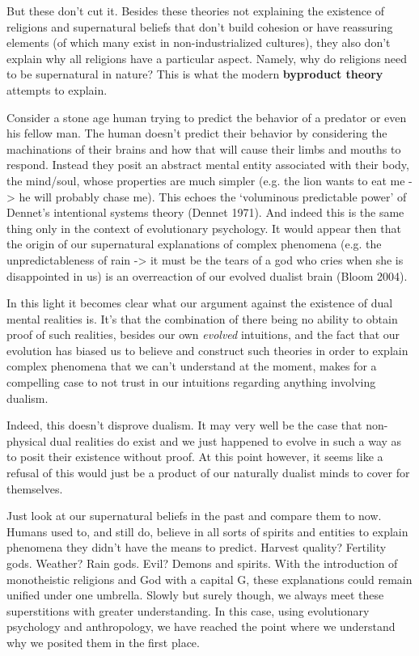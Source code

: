 \documentclass[11pt]{diazessay} %
\begin{document}
		But these don't cut it. Besides these theories not explaining the existence of religions and supernatural beliefs that don't build cohesion or have reassuring elements (of which many exist in non-industrialized cultures), they also don't explain why all religions have a particular aspect. Namely, why do religions need to be supernatural in nature? This is what the modern \textbf{byproduct theory} attempts to explain.
		
		Consider a stone age human trying to predict the behavior of a predator or even his fellow man. The human doesn't predict their behavior by considering the machinations of their brains and how that will cause their limbs and mouths to respond. Instead they posit an abstract mental entity associated with their body, the mind/soul, whose properties are much simpler (e.g. the lion wants to eat me -> he will probably chase me). This echoes the `voluminous predictable power' of Dennet's intentional systems theory (Dennet 1971). And indeed this is the same thing only in the context of evolutionary psychology. It would appear then that the origin of our supernatural explanations of complex phenomena (e.g. the unpredictableness of rain -> it must be the tears of a god who cries when she is disappointed in us) is an overreaction of our evolved dualist brain (Bloom 2004).
		
		In this light it becomes clear what our argument against the existence of dual mental realities is. It's that the combination of there being no ability to obtain proof of such realities, besides our own \emph{evolved} intuitions, and the fact that our evolution has biased us to believe and construct such theories in order to explain complex phenomena that we can't understand at the moment, makes for a compelling case to not trust in our intuitions regarding anything involving dualism.
		
		Indeed, this doesn't disprove dualism. It may very well be the case that non-physical dual realities do exist and we just happened to evolve in such a way as to posit their existence without proof. At this point however, it seems like a refusal of this would just be a product of our naturally dualist minds to cover for themselves.
		
		Just look at our supernatural beliefs in the past and compare them to now. Humans used to, and still do, believe in all sorts of spirits and entities to explain phenomena they didn't have the means to predict. Harvest quality? Fertility gods. Weather? Rain gods. Evil? Demons and spirits. With the introduction of monotheistic religions and God with a capital G, these explanations could remain unified under one umbrella. Slowly but surely though, we always meet these superstitions with greater understanding. In this case, using evolutionary psychology and anthropology, we have reached the point where we understand why we posited them in the first place.
\end{document}
